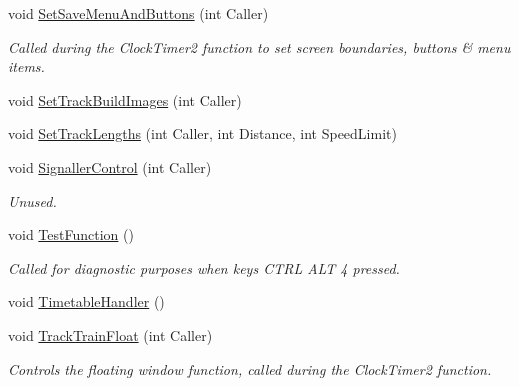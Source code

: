 \begin{DoxyCompactItemize}
void \mbox{\hyperlink{class_t_interface_afeb3a4236e5cfa7e93d7d5167304f937}{Set\+Save\+Menu\+And\+Buttons}} (int Caller)
\begin{DoxyCompactList}\small\item\em Called during the Clock\+Timer2 function to set screen boundaries, buttons \& menu items. \end{DoxyCompactList}\item 
void \mbox{\hyperlink{class_t_interface_a5c1caa770e377ec064458f42f6301ecd}{Set\+Track\+Build\+Images}} (int Caller)
\item 
void \mbox{\hyperlink{class_t_interface_acc36eb15dae8d564e6d91f8c6596065c}{Set\+Track\+Lengths}} (int Caller, int Distance, int Speed\+Limit)
\item 
\mbox{\label{class_t_interface_a060bde8a69c30d3049d1f97e6b5dfe2f}} 
void \mbox{\hyperlink{class_t_interface_a060bde8a69c30d3049d1f97e6b5dfe2f}{Signaller\+Control}} (int Caller)
\begin{DoxyCompactList}\small\item\em Unused. \end{DoxyCompactList}\item 
\mbox{\label{class_t_interface_a8d70d503d6aa655aea00771143cb5912}} 
void \mbox{\hyperlink{class_t_interface_a8d70d503d6aa655aea00771143cb5912}{Test\+Function}} ()
\begin{DoxyCompactList}\small\item\em Called for diagnostic purposes when keys C\+T\+RL A\+LT 4 pressed. \end{DoxyCompactList}\item 
void \mbox{\hyperlink{class_t_interface_a4502fb89b8be8afeaf2771fbe5d0cd75}{Timetable\+Handler}} ()
\item 
\mbox{\label{class_t_interface_a9aaa19d39382a32701d7ded3b8c1802b}} 
void \mbox{\hyperlink{class_t_interface_a9aaa19d39382a32701d7ded3b8c1802b}{Track\+Train\+Float}} (int Caller)
\begin{DoxyCompactList}\small\item\em Controls the floating window function, called during the Clock\+Timer2 function. \end{DoxyCompactList}\end{DoxyCompactItemize}
